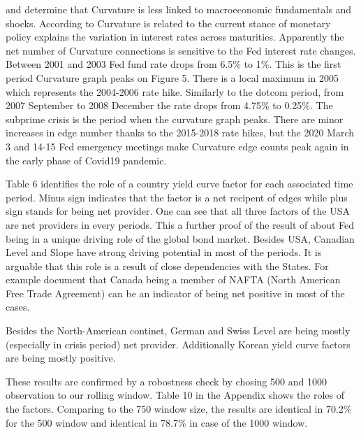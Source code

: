 \documentclass[12pt,bibliography=totoc]{article}
\begin{document}
\cite{dewachter2006macro} and \cite{diebold2006forecasting} determine that Curvature is less linked to macroeconomic fundamentals and shocks. According to \cite{abbritti2013global} Curvature is related to the current stance of monetary policy explains the variation in interest rates across maturities.
Apparently the net number of Curvature connections is sensitive to the Fed interest rate changes. Between 2001 and 2003 Fed fund rate drops from 6.5\% to 1\%. This is the first period Curvature graph peaks on Figure 5. There is a local maximum in 2005 which represents the 2004-2006 rate hike. Similarly to the dotcom period, from 2007 September to 2008 December the rate drops from 4.75\% to 0.25\%. The subprime crisis is the period when the curvature graph peaks. There are minor increases in edge number thanks to the 2015-2018 rate hikes, but the 2020 March 3 and 14-15 Fed emergency meetings make Curvature edge counts peak again in the early phase of Covid19 pandemic. 

\medskip 

Table 6 identifies the role of a country yield curve factor for each associated time period. Minus sign indicates that the factor is a net recipent of edges while plus sign stands for being net provider. One can see that all three factors of the USA are net providers in every periods. This a further proof of the result of \cite{brusa2020one} about Fed being in a unique driving role of the global bond market. Besides USA, Canadian Level and Slope have strong driving potential in most of the periods. It is arguable that this role is a result of close dependencies with the States. For example \cite{greenwood2015measuring} document that Canada being a member of NAFTA (North American Free Trade Agreement) can be an indicator of being net positive in most of the cases. 

Besides the North-American continet, German and Swiss Level are being mostly (especially in crisis period) net provider. Additionally Korean yield curve factors are being mostly positive. 

These results are confirmed by a robostness check by chosing 500 and 1000 observation to our rolling window. Table 10 in the Appendix shows the roles of the factors. Comparing to the 750 window size, the results are identical in 70.2\% for the 500 window and identical in 78.7\% in case of the 1000 window.
\end{document}
